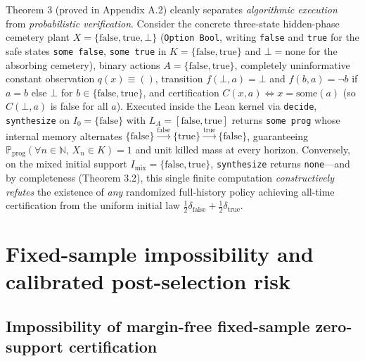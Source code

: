 \documentclass[11pt,a4paper]{article}
\newcounter{none}
\begin{document}
Theorem 3 (proved in Appendix A.2) cleanly separates \emph{algorithmic
execution} from \emph{probabilistic verification}. Consider the concrete
three-state hidden-phase cemetery plant
\(X = \{\mathrm{false}, \mathrm{true}, \bot\}\) (\texttt{Option\ Bool},
writing \texttt{false} and \texttt{true} for the safe states
\texttt{some\ false}, \texttt{some\ true} in
\(K = \{\mathrm{false}, \mathrm{true}\}\) and \(\bot = \mathrm{none}\)
for the absorbing cemetery), binary actions
\(A = \{\mathrm{false}, \mathrm{true}\}\), completely uninformative
constant observation \(q(x) \equiv ()\), transition
\(f(\bot, a) = \bot\) and \(f(b, a) = \neg b\) if \(a = b\) else
\(\bot\) for \(b \in \{\mathrm{false}, \mathrm{true}\}\), and
certification \(C(x,a) \iff x = \mathrm{some}(a)\) (so \(C(\bot, a)\) is
false for all \(a\)). Executed inside the Lean kernel via
\texttt{decide}, \texttt{synthesize} on \(I_0 = \{\mathrm{false}\}\)
with \(L_A = [\mathrm{false}, \mathrm{true}]\) returns
\texttt{some\ prog} whose internal memory alternates
\(\{\mathrm{false}\} \xrightarrow{\mathrm{false}} \{\mathrm{true}\} \xrightarrow{\mathrm{true}} \{\mathrm{false}\}\),
guaranteeing
\(\mathbb{P}_{\mathrm{prog}}(\forall n \in \mathbb{N},\, X_n \in K) = 1\)
and unit killed mass at every horizon. Conversely, on the mixed initial
support \(I_{\mathrm{mix}} = \{\mathrm{false}, \mathrm{true}\}\),
\texttt{synthesize} returns \texttt{none}---and by completeness (Theorem
3.2), this single finite computation \emph{constructively refutes} the
existence of \emph{any} randomized full-history policy achieving
all-time certification from the uniform initial law
\(\frac{1}{2}\delta_{\mathrm{false}} + \frac{1}{2}\delta_{\mathrm{true}}\).

\section{Fixed-sample impossibility and calibrated post-selection
risk}\label{fixed-sample-impossibility-and-calibrated-post-selection-risk}

\subsection{Impossibility of margin-free fixed-sample zero-support
certification}\label{impossibility-of-margin-free-fixed-sample-zero-support-certification}
\end{document}
